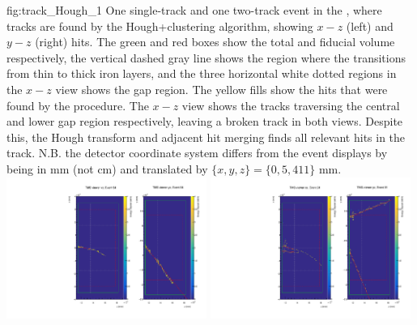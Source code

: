 \begin{dunefigure}{fig:track_Hough_1}
{One single-track and one two-track event in the , where tracks are found by the Hough+clustering algorithm, showing $x-z$ (left) and $y-z$ (right) hits. The green and red boxes show the total and fiducial volume respectively, the vertical dashed gray line shows the region where the  transitions from thin to thick iron layers, and the three horizontal white dotted regions in the $x-z$ view shows the gap region. The yellow fills show the hits that were found by the procedure. The $x-z$ view shows the tracks traversing the central and lower gap region respectively, leaving a broken track in both views. Despite this, the Hough transform and adjacent hit merging finds all relevant hits in the track. N.B. the detector coordinate system differs from the event displays by being in mm (not cm) and translated by $\{x,y,z\}=\{0, 5, 411\}$ mm. }
\includegraphics[width=0.49\textwidth]{graphics/tms/Simulation/Hough/Hough_Example.pdf} \includegraphics[width=0.49\textwidth]{graphics/tms/Simulation/Hough/2track_hough_2.pdf}
\end{dunefigure}

